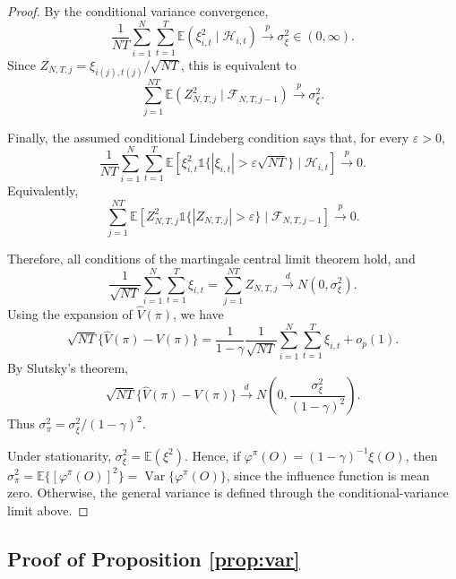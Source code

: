\documentclass[12pt]{article}
\newcommand{\0}{\boldsymbol{0}}
\begin{document}
\begin{proof}
By the conditional variance convergence,
\[
\frac{1}{NT}\sum_{i=1}^N\sum_{t=1}^T\mathbb E(\xi_{i,t}^2\mid \mathcal H_{i,t})\overset{p}{\longrightarrow}\sigma_\xi^2\in(0,\infty).
\]
Since \(Z_{N,T,j}=\xi_{i(j),t(j)}/\sqrt{NT}\), this is equivalent to
\[
\sum_{j=1}^{NT}\mathbb E(Z_{N,T,j}^2\mid \mathcal F_{N,T,j-1})\overset{p}{\longrightarrow}\sigma_\xi^2.
\]

Finally, the assumed conditional Lindeberg condition says that, for every
\(\varepsilon>0\),
\[
\frac{1}{NT}\sum_{i=1}^N\sum_{t=1}^T
\mathbb E\!\left[\xi_{i,t}^2\mathds 1\{|\xi_{i,t}|>\varepsilon\sqrt{NT}\}\mid \mathcal H_{i,t}
\right]\overset{p}{\longrightarrow}0.
\]
Equivalently,
\[
\sum_{j=1}^{NT}\mathbb E\!\left[Z_{N,T,j}^2\mathds 1\{|Z_{N,T,j}|>\varepsilon\}\mid \mathcal F_{N,T,j-1}\right]\overset{p}{\longrightarrow}0.
\]

Therefore, all conditions of the martingale central limit theorem hold, and
\[
\frac{1}{\sqrt{NT}}\sum_{i=1}^N\sum_{t=1}^T \xi_{i,t}=\sum_{j=1}^{NT}Z_{N,T,j}\overset{d}{\longrightarrow}N(0,\sigma_\xi^2).
\]
Using the expansion of \(\widehat V(\pi)\), we have
\[
\sqrt{NT}\{\widehat V(\pi)-V(\pi)\}=\frac{1}{1-\gamma}\frac{1}{\sqrt{NT}}\sum_{i=1}^N\sum_{t=1}^T \xi_{i,t}+
o_p(1).
\]
By Slutsky's theorem,
\[
\sqrt{NT}\{\widehat V(\pi)-V(\pi)\}\overset{d}{\longrightarrow}N\left(0,\frac{\sigma_\xi^2}{(1-\gamma)^2}\right).
\]
Thus \(\sigma_\pi^2=\sigma_\xi^2/(1-\gamma)^2\).

Under stationarity, \(\sigma_\xi^2=\mathbb E(\xi^2)\). Hence, if \(\varphi^\pi(O)=(1-\gamma)^{-1}\xi(O)\), then \(\sigma_\pi^2=\mathbb E\{[\varphi^\pi(O)]^2\} =\operatorname{Var}\{\varphi^\pi(O)\}\), since the influence function is mean zero. Otherwise, the general variance is defined through the conditional-variance limit above.

\end{proof}

\subsection{Proof of Proposition \ref{prop:var}}
\end{document}
